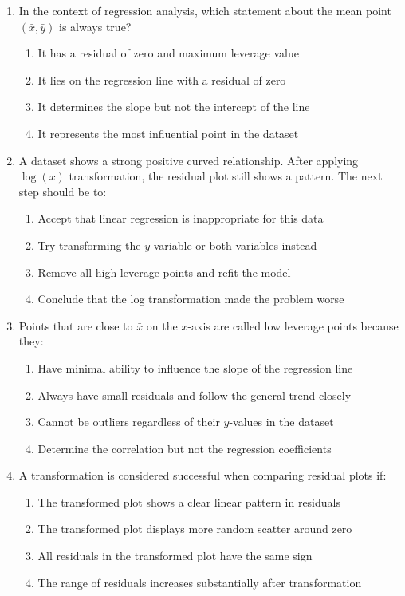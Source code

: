 \documentclass[11pt]{article}
\begin{document}
\begin{enumerate}
\item In the context of regression analysis, which statement about the mean point $(\bar{x}, \bar{y})$ is always true?
\begin{enumerate}[label=(\Alph*)]
\item It has a residual of zero and maximum leverage value
\item It lies on the regression line with a residual of zero
\item It determines the slope but not the intercept of the line
\item It represents the most influential point in the dataset
\end{enumerate}

\item A dataset shows a strong positive curved relationship. After applying $\log(x)$ transformation, the residual plot still shows a pattern. The next step should be to:
\begin{enumerate}[label=(\Alph*)]
\item Accept that linear regression is inappropriate for this data
\item Try transforming the $y$-variable or both variables instead
\item Remove all high leverage points and refit the model
\item Conclude that the log transformation made the problem worse
\end{enumerate}

\item Points that are close to $\bar{x}$ on the $x$-axis are called low leverage points because they:
\begin{enumerate}[label=(\Alph*)]
\item Have minimal ability to influence the slope of the regression line
\item Always have small residuals and follow the general trend closely
\item Cannot be outliers regardless of their $y$-values in the dataset
\item Determine the correlation but not the regression coefficients
\end{enumerate}

\item A transformation is considered successful when comparing residual plots if:
\begin{enumerate}[label=(\Alph*)]
\item The transformed plot shows a clear linear pattern in residuals
\item The transformed plot displays more random scatter around zero
\item All residuals in the transformed plot have the same sign
\item The range of residuals increases substantially after transformation
\end{enumerate}


\end{enumerate}
\end{document}

